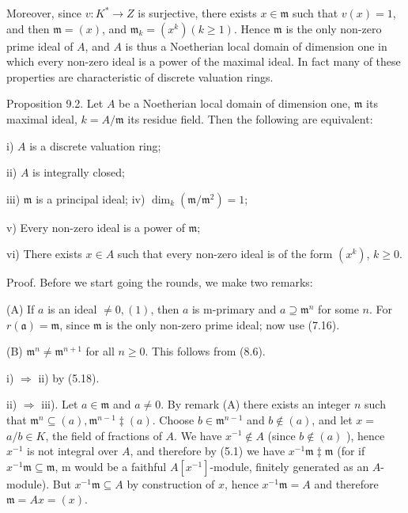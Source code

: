 \documentclass{standalone}
\theoremstyle{definition}
\theoremstyle{remark}
\begin{document}
Moreover, since $v: K^{*} \rightarrow Z$ is surjective, there exists $x \in \mathfrak{m}$ such that $v(x)=1$, and then $\mathfrak{m}=(x)$, and $\mathfrak{m}_{k}=\left(x^{k}\right)(k \geqslant 1)$. Hence $\mathfrak{m}$ is the only non-zero prime ideal of $A$, and $A$ is thus a Noetherian local domain of dimension one in which every non-zero ideal is a power of the maximal ideal. In fact many of these properties are characteristic of discrete valuation rings.

Proposition 9.2. Let $A$ be a Noetherian local domain of dimension one, $\mathfrak{m}$ its maximal ideal, $k=A / \mathfrak{m}$ its residue field. Then the following are equivalent:

i) $A$ is a discrete valuation ring;

ii) $A$ is integrally closed;

iii) $\mathfrak{m}$ is a principal ideal; iv) $\operatorname{dim}_{k}\left(\mathfrak{m} / \mathfrak{m}^{2}\right)=1$;

v) Every non-zero ideal is a power of $\mathfrak{m}$;

vi) There exists $x \in A$ such that every non-zero ideal is of the form $\left(x^{k}\right)$, $k \geqslant 0$.

Proof. Before we start going the rounds, we make two remarks:

(A) If $a$ is an ideal $\neq 0,(1)$, then $a$ is m-primary and $a \supseteq \mathfrak{m}^{n}$ for some $n$. For $r(\mathfrak{a})=\mathfrak{m}$, since $\mathfrak{m}$ is the only non-zero prime ideal; now use (7.16).

(B) $\mathfrak{m}^{n} \neq \mathfrak{m}^{n+1}$ for all $n \geqslant 0$. This follows from (8.6).

i) $\Rightarrow$ ii) by (5.18).

ii) $\Rightarrow$ iii). Let $a \in \mathfrak{m}$ and $a \neq 0$. By remark (A) there exists an integer $n$ such that $\mathfrak{m}^{n} \subseteq(a), \mathfrak{m}^{n-1} \ddagger(a)$. Choose $b \in \mathfrak{m}^{n-1}$ and $b \notin(a)$, and let $x=$ $a / b \in K$, the field of fractions of $A$. We have $x^{-1} \notin A$ (since $b \notin(a)$ ), hence $x^{-1}$ is not integral over $A$, and therefore by (5.1) we have $x^{-1} \mathfrak{m} \ddagger \mathfrak{m}$ (for if $x^{-1} \mathfrak{m} \subseteq \mathfrak{m}$, m would be a faithful $A\left[x^{-1}\right]$-module, finitely generated as an $A$-module). But $x^{-1} \mathfrak{m} \subseteq A$ by construction of $x$, hence $x^{-1} \mathfrak{m}=A$ and therefore $\mathfrak{m}=A x=(x)$.
\end{document}
